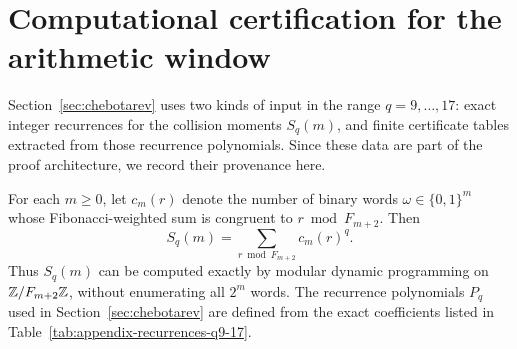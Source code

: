 \section{Computational certification for the arithmetic window}
\label{app:certification}

Section~\ref{sec:chebotarev} uses two kinds of input in the range
\(q=9,\dots,17\): exact integer recurrences for the collision moments
\(S_q(m)\), and finite certificate tables extracted from those recurrence
polynomials.  Since these data are part of the proof architecture, we record
their provenance here.

For each \(m\ge 0\), let \(c_m(r)\) denote the number of binary words
\(\omega\in\{0,1\}^m\) whose Fibonacci-weighted sum is congruent to
\(r\bmod F_{m+2}\).  Then
\[
  S_q(m)=\sum_{r\bmod F_{m+2}} c_m(r)^q.
\]
Thus \(S_q(m)\) can be computed exactly by modular dynamic programming on
\(\mathbb{Z}/F_{m+2}\mathbb{Z}\), without enumerating all \(2^m\) words.  The recurrence
polynomials \(P_q\) used in Section~\ref{sec:chebotarev} are defined from the
exact coefficients listed in Table~\ref{tab:appendix-recurrences-q9-17}.

